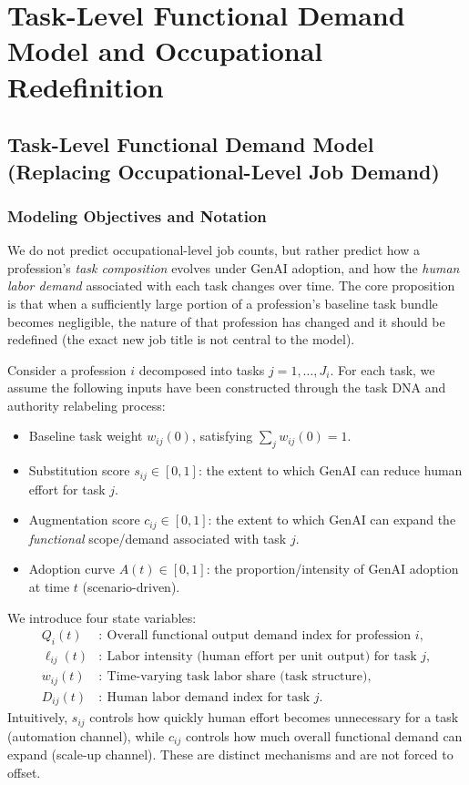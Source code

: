 \section{Task-Level Functional Demand Model and Occupational Redefinition}
\label{sec:task_level_model}

\subsection{Task-Level Functional Demand Model (Replacing Occupational-Level Job Demand)}
\subsubsection{Modeling Objectives and Notation}
\label{sec:notation}
We do not predict occupational-level job counts, but rather predict how a profession's \emph{task composition} evolves under GenAI adoption, and how the \emph{human labor demand} associated with each task changes over time. The core proposition is that when a sufficiently large portion of a profession's baseline task bundle becomes negligible, the nature of that profession has changed and it should be redefined (the exact new job title is not central to the model).

Consider a profession $i$ decomposed into tasks $j=1,\dots,J_i$. For each task, we assume the following inputs have been constructed through the task DNA and authority relabeling process:
\begin{itemize}
  \item Baseline task weight $w_{ij}(0)$, satisfying $\sum_{j} w_{ij}(0)=1$.
  \item Substitution score $s_{ij}\in[0,1]$: the extent to which GenAI can reduce human effort for task $j$.
  \item Augmentation score $c_{ij}\in[0,1]$: the extent to which GenAI can expand the \emph{functional} scope/demand associated with task $j$.
  \item Adoption curve $A(t)\in[0,1]$: the proportion/intensity of GenAI adoption at time $t$ (scenario-driven).
\end{itemize}

We introduce four state variables:
\begin{align*}
Q_i(t) &:\ \text{Overall functional output demand index for profession } i,\\
\ell_{ij}(t) &:\ \text{Labor intensity (human effort per unit output) for task } j,\\
w_{ij}(t) &:\ \text{Time-varying task labor share (task structure)},\\
D_{ij}(t) &:\ \text{Human labor demand index for task } j.
\end{align*}
Intuitively, $s_{ij}$ controls how quickly human effort becomes unnecessary for a task (automation channel), while $c_{ij}$ controls how much overall functional demand can expand (scale-up channel). These are distinct mechanisms and are not forced to offset.

